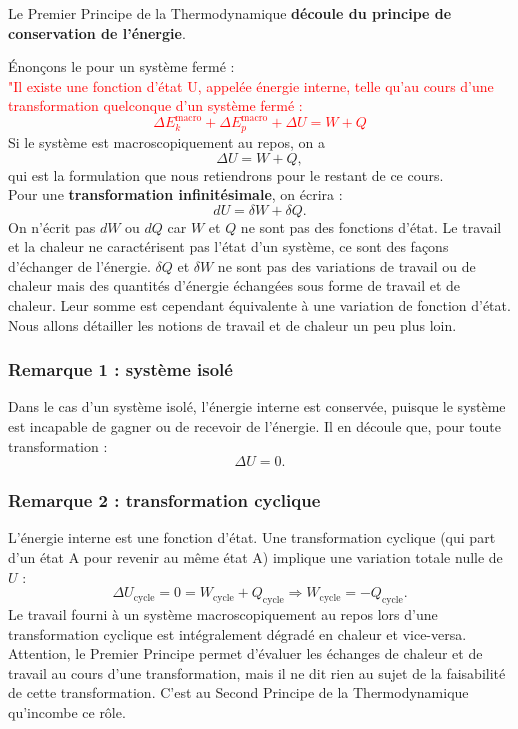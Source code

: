 \documentclass[11pt,a4paper]{report}
\begin{document}
Le Premier Principe de la Thermodynamique \textbf{découle du principe de conservation de l'énergie}.

\'Enonçons le pour un système fermé :\\
\textcolor{red}{"Il existe une fonction d'état U, appelée énergie interne, telle qu'au cours d'une transformation quelconque d'un système fermé :
\begin{equation}
	\Delta E_{k}^{\text{macro}} + \Delta E_{p}^{\text{macro}} + \Delta U = W + Q
\end{equation}
}
Si le système est macroscopiquement au repos, on a
\begin{equation}
	\Delta U = W + Q,
\end{equation}
qui est la formulation que nous retiendrons pour le restant de ce cours.\\

Pour une \textbf{transformation infinitésimale}, on écrira :
\begin{equation}
	dU = \delta W + \delta Q.
\end{equation}
On n'écrit pas $dW$ ou $dQ$ car $W$ et $Q$ ne sont pas des fonctions d'état. Le travail et la chaleur ne caractérisent pas l'état d'un système, ce sont des façons d'échanger de l'énergie. $\delta Q$ et $\delta W$ ne sont pas des variations de travail ou de chaleur mais des quantités d'énergie échangées sous forme de travail et de chaleur. Leur somme est cependant équivalente à une variation de fonction d'état. Nous allons détailler les notions de travail et de chaleur un peu plus loin.

\subsubsection{Remarque 1 : système isolé}
Dans le cas d'un système isolé, l'énergie interne est conservée, puisque le système est incapable de gagner ou de recevoir de l'énergie. Il en découle que, pour toute transformation :
\begin{equation}
	\Delta U = 0.
\end{equation}

\subsubsection{Remarque 2 : transformation cyclique}
L'énergie interne est une fonction d'état. Une transformation cyclique (qui part d'un état A pour revenir au même état A) implique une variation totale nulle de $U$ :
\begin{equation}
	\Delta U_{\text{cycle}} = 0 = W_\text{cycle} + Q_\text{cycle} \Rightarrow W_\text{cycle} = - Q_\text{cycle}.
\end{equation}
Le travail fourni à un système macroscopiquement au repos lors d'une transformation cyclique est intégralement dégradé en chaleur et vice-versa. Attention, le Premier Principe permet d'évaluer les échanges de chaleur et de travail au cours d'une transformation, mais il ne dit rien au sujet de la faisabilité de cette transformation. C'est au Second Principe de la Thermodynamique qu'incombe ce rôle.
\end{document}
